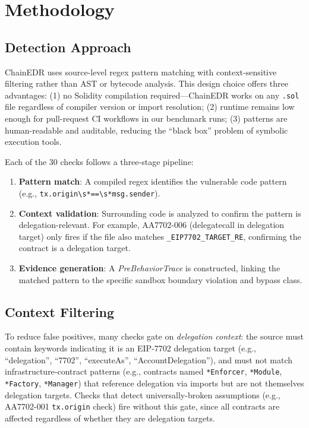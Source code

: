\section{Methodology}
\label{sec:methodology}

\subsection{Detection Approach}

ChainEDR uses source-level regex pattern matching with context-sensitive filtering rather than AST or bytecode analysis. This design choice offers three advantages: (1) no Solidity compilation required---ChainEDR works on any \texttt{.sol} file regardless of compiler version or import resolution; (2) runtime remains low enough for pull-request CI workflows in our benchmark runs; (3) patterns are human-readable and auditable, reducing the ``black box'' problem of symbolic execution tools.

Each of the 30 checks follows a three-stage pipeline:

\begin{enumerate}
    \item \textbf{Pattern match}: A compiled regex identifies the vulnerable code pattern (e.g., \texttt{tx.origin\textbackslash{}s*==\textbackslash{}s*msg.sender}).
    \item \textbf{Context validation}: Surrounding code is analyzed to confirm the pattern is delegation-relevant. For example, AA7702-006 (delegatecall in delegation target) only fires if the file also matches \texttt{\_EIP7702\_TARGET\_RE}, confirming the contract is a delegation target.
    \item \textbf{Evidence generation}: A \textit{PreBehaviorTrace} is constructed, linking the matched pattern to the specific sandbox boundary violation and bypass class.
\end{enumerate}

\subsection{Context Filtering}

To reduce false positives, many checks gate on \textit{delegation context}: the source must contain keywords indicating it is an EIP-7702 delegation target (e.g., ``delegation'', ``7702'', ``executeAs'', ``AccountDelegation''), and must not match infrastructure-contract patterns (e.g., contracts named \texttt{*Enforcer}, \texttt{*Module}, \texttt{*Factory}, \texttt{*Manager}) that reference delegation via imports but are not themselves delegation targets. Checks that detect universally-broken assumptions (e.g., AA7702-001 \texttt{tx.origin} check) fire without this gate, since all contracts are affected regardless of whether they are delegation targets.

